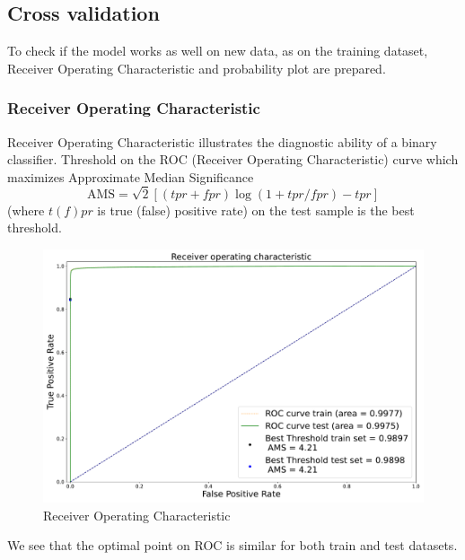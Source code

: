 \documentclass[12pt,a4paper]{report}
\begin{document}
\subsection{Cross validation}
To check if the model works as well on new data, as on the training dataset,  Receiver Operating Characteristic and probability plot are prepared.

\subsubsection{Receiver Operating Characteristic}
Receiver Operating Characteristic illustrates the diagnostic ability of a binary classifier. Threshold on the ROC (Receiver Operating Characteristic) curve which maximizes Approximate Median Significance 
\begin{equation}
    \text{AMS}= \sqrt{2} [(tpr + fpr) \log(1 + tpr/fpr) - tpr]
\end{equation}
(where $t(f)pr$ is true (false) positive rate) on the test sample is the best threshold.
\begin{figure}[H]
    \centering
    \includegraphics[width=1\textwidth]{images/ams.pdf}
    \caption{Receiver Operating Characteristic}
\end{figure}
We see that the optimal point on ROC is similar for both train and test datasets.
\end{document}
